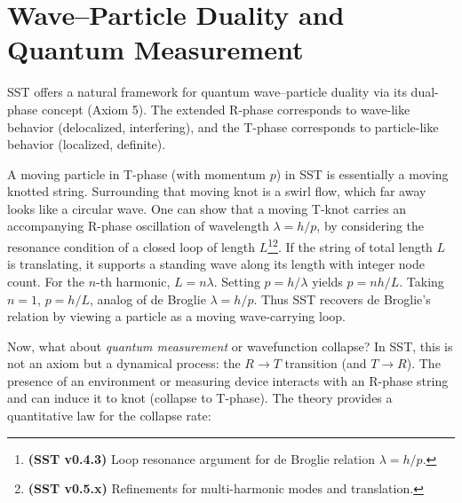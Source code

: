 \documentclass[reprint,aps,onecolumn,nofootinbib]{revtex4-2}
\begin{document}
\section{Wave–Particle Duality and Quantum Measurement}
    SST offers a natural framework for quantum wave–particle duality via its dual-phase concept (Axiom 5). The extended R-phase corresponds to wave-like behavior (delocalized, interfering), and the T-phase corresponds to particle-like behavior (localized, definite).

    A moving particle in T-phase (with momentum $p$) in SST is essentially a moving knotted string. Surrounding that moving knot is a swirl flow, which far away looks like a circular wave. One can show that a moving T-knot carries an accompanying R-phase oscillation of wavelength $\lambda = h/p$, by considering the resonance condition of a closed loop of length $L$\footnote{\textbf{(SST v0.4.3)} Loop resonance argument for de Broglie relation $\lambda=h/p$.}\footnote{\textbf{(SST v0.5.x)} Refinements for multi-harmonic modes and translation.}. If the string of total length $L$ is translating, it supports a standing wave along its length with integer node count. For the $n$-th harmonic, $L = n \lambda$. Setting $p = h/\lambda$ yields $p = n h/L$. Taking $n=1$, $p = h/L$, analog of de Broglie $\lambda = h/p$. Thus SST recovers de Broglie’s relation by viewing a particle as a moving wave-carrying loop.

    Now, what about \emph{quantum measurement} or wavefunction collapse? In SST, this is not an axiom but a dynamical process: the $R\to T$ transition (and $T\to R$). The presence of an environment or measuring device interacts with an R-phase string and can induce it to knot (collapse to T-phase). The theory provides a quantitative law for the collapse rate:
\end{document}
